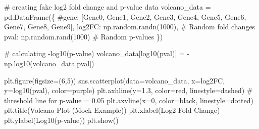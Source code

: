 \documentclass[
  letterpaper,
  DIV=11,
  numbers=noendperiod]{scrartcl}
\newenvironment{Shaded}{\begin{snugshade}}{\end{snugshade}}
\newcommand{\CommentTok}[1]{\textcolor[rgb]{0.37,0.37,0.37}{#1}}
\newcommand{\DecValTok}[1]{\textcolor[rgb]{0.68,0.00,0.00}{#1}}
\newcommand{\FloatTok}[1]{\textcolor[rgb]{0.68,0.00,0.00}{#1}}
\newcommand{\NormalTok}[1]{\textcolor[rgb]{0.00,0.23,0.31}{#1}}
\newcommand{\OperatorTok}[1]{\textcolor[rgb]{0.37,0.37,0.37}{#1}}
\newcommand{\StringTok}[1]{\textcolor[rgb]{0.13,0.47,0.30}{#1}}
\begin{document}
\begin{Shaded}
\begin{Highlighting}[]
\CommentTok{\# creating fake log2 fold change and p{-}value data}
\NormalTok{volcano\_data }\OperatorTok{=}\NormalTok{ pd.DataFrame(\{}
    \CommentTok{\#\textquotesingle{}gene\textquotesingle{}: [\textquotesingle{}Gene0\textquotesingle{}, \textquotesingle{}Gene1\textquotesingle{}, \textquotesingle{}Gene2\textquotesingle{}, \textquotesingle{}Gene3\textquotesingle{}, \textquotesingle{}Gene4\textquotesingle{}, \textquotesingle{}Gene5\textquotesingle{}, \textquotesingle{}Gene6\textquotesingle{}, \textquotesingle{}Gene7\textquotesingle{}, \textquotesingle{}Gene8\textquotesingle{}, \textquotesingle{}Gene9\textquotesingle{}],}
    \StringTok{\textquotesingle{}log2FC\textquotesingle{}}\NormalTok{: np.random.randn(}\DecValTok{1000}\NormalTok{),  }\CommentTok{\# Random fold changes}
    \StringTok{\textquotesingle{}pval\textquotesingle{}}\NormalTok{: np.random.rand(}\DecValTok{1000}\NormalTok{)  }\CommentTok{\# Random p{-}values}
\NormalTok{\})}

\CommentTok{\# calculating {-}log10(p{-}value)}
\NormalTok{volcano\_data[}\StringTok{\textquotesingle{}{-}log10(pval)\textquotesingle{}}\NormalTok{] }\OperatorTok{=} \OperatorTok{{-}}\NormalTok{np.log10(volcano\_data[}\StringTok{\textquotesingle{}pval\textquotesingle{}}\NormalTok{])}

\NormalTok{plt.figure(figsize}\OperatorTok{=}\NormalTok{(}\DecValTok{6}\NormalTok{,}\DecValTok{5}\NormalTok{))}
\NormalTok{sns.scatterplot(data}\OperatorTok{=}\NormalTok{volcano\_data, x}\OperatorTok{=}\StringTok{\textquotesingle{}log2FC\textquotesingle{}}\NormalTok{, y}\OperatorTok{=}\StringTok{\textquotesingle{}{-}log10(pval)\textquotesingle{}}\NormalTok{, color}\OperatorTok{=}\StringTok{\textquotesingle{}purple\textquotesingle{}}\NormalTok{)}
\NormalTok{plt.axhline(y}\OperatorTok{=}\FloatTok{1.3}\NormalTok{, color}\OperatorTok{=}\StringTok{\textquotesingle{}red\textquotesingle{}}\NormalTok{, linestyle}\OperatorTok{=}\StringTok{\textquotesingle{}dashed\textquotesingle{}}\NormalTok{)  }\CommentTok{\# threshold line for p{-}value = 0.05}
\NormalTok{plt.axvline(x}\OperatorTok{=}\DecValTok{0}\NormalTok{, color}\OperatorTok{=}\StringTok{\textquotesingle{}black\textquotesingle{}}\NormalTok{, linestyle}\OperatorTok{=}\StringTok{\textquotesingle{}dotted\textquotesingle{}}\NormalTok{)}
\NormalTok{plt.title(}\StringTok{\textquotesingle{}Volcano Plot (Mock Example)\textquotesingle{}}\NormalTok{)}
\NormalTok{plt.xlabel(}\StringTok{\textquotesingle{}Log2 Fold Change\textquotesingle{}}\NormalTok{)}
\NormalTok{plt.ylabel(}\StringTok{\textquotesingle{}{-}Log10(p{-}value)\textquotesingle{}}\NormalTok{)}
\NormalTok{plt.show()}
\end{Highlighting}
\end{Shaded}
\end{document}
